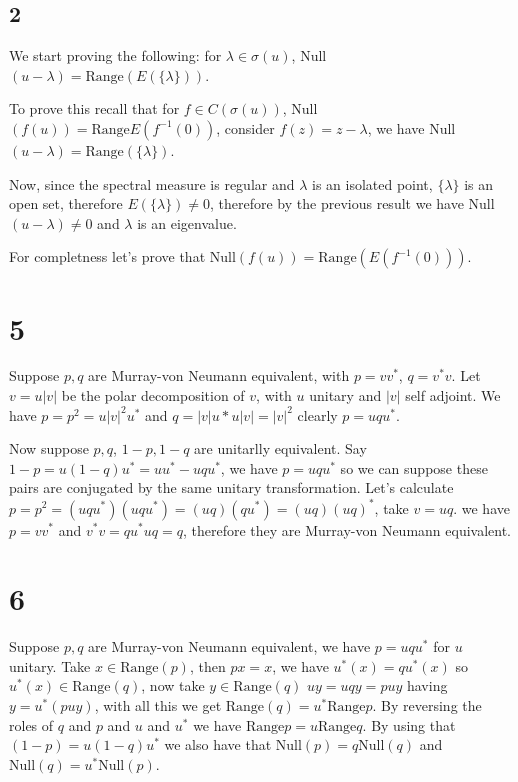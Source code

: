 \documentclass{article}
\begin{document}
\subsection*{2}

We start proving the following: for $\lambda\in \sigma(u)$, Null$(u-\lambda)=
\text{Range}(E(\{\lambda\}))$. 

To prove this recall that for $f\in C(\sigma(u))$, Null$(f(u))=\text{Range}
E(f^{-1}(0))$, consider $f(z)=z-\lambda$, we have Null$(u-\lambda)=\text{Range}
(\{\lambda\})$. 

Now, since the spectral measure is regular and $\lambda$ is an isolated point, 
$\{\lambda\}$ is an open set, therefore $E(\{\lambda\})\neq 0$, therefore by
the previous result we have Null$(u-\lambda)\neq 0$ and $\lambda$ is an eigenvalue.


For completness let's prove that Null$(f(u))=\text{Range}(E(f^{-1}(0)))$. 






\section*{5}

 \quad\quad   Suppose $p,q$ are Murray-von Neumann equivalent, with $p=vv^\ast$, $q=v^\ast v$. Let $v=u|v|$ be the polar
decomposition of $v$, with $u$ unitary and $|v|$ self adjoint. We have $p=p^2=u|v|^2u^\ast$ 
and $q=|v|u\ast u |v|=|v|^2$
clearly $p=uqu^\ast$.

Now suppose $p,q$, $1-p,1-q$ are unitarlly equivalent. Say $1-p=u(1-q)u^\ast=uu^\ast -uqu^\ast$, we have
$p=uqu^\ast$ so we can suppose these pairs are conjugated by the same unitary transformation. 
Let's calculate $p=p^2=(uqu^\ast)(uqu^\ast)=(uq)(qu^\ast)=(uq)(uq)^\ast $, take $v=uq$. we have $p=vv^\ast$
and $v^\ast v= qu^\ast u q=q$, therefore they are Murray-von Neumann equivalent.


\section*{6}

Suppose $p,q$ are Murray-von Neumann equivalent, we have $p=uqu^\ast$ for $u$ unitary. Take $x\in\text{Range}(p)$, then $px=x$,
we have $u^\ast(x)=qu^\ast(x)$ so $u^\ast(x)\in \text{Range}(q)$, now take $y\in \text{Range}(q)$ 
$uy=uqy=puy$ having $y=u^\ast(puy)$, with all this we get $\text{Range}(q)=u^\ast \text{Range}p$.
By reversing the roles of $q$ and $p$ and $u$ and $u^\ast$ we have $\text{Range}p=
u\text{Range}q$. By using that $(1-p)=u(1-q)u^\ast$ we also have that $\text{Null} (p)=q\text{Null}(q)$
and $\text{Null}(q)=u^\ast\text{Null}(p)$. 
\end{document}

